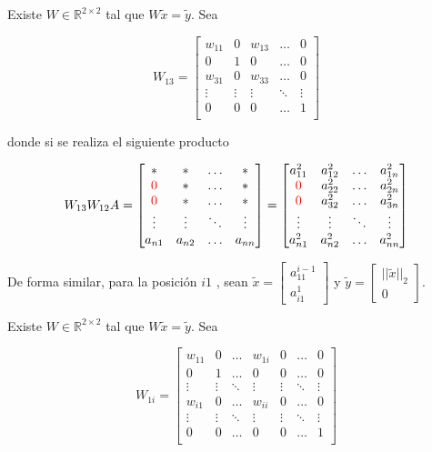 Existe $W \in \mathbb{R}^{2 \times 2}$ tal que $W\tilde{x} = \tilde{y}$. Sea

\[
W_{13} =
\begin{bmatrix}
    w_{11} & 0 & w_{13} & \ldots & 0 \\
    0 & 1 & 0 & \ldots & 0 \\
    w_{31} & 0 & w_{33} & \ldots & 0 \\
    \vdots & \vdots & \vdots & \ddots & \vdots \\
    0 & 0 & 0 & \ldots & 1 \\
\end{bmatrix}
\]

donde si se realiza el siguiente producto

\[
W_{13}W_{12}A =
\begin{bmatrix}
    * & * & \ldots & * \\
    \textcolor{red}{0} & * & \ldots & * \\
    \textcolor{red}{0} & * & \ldots & * \\
    \vdots & \vdots & \ddots & \vdots \\
    a_{n1} & a_{n2} & \ldots & a_{nn} \\
\end{bmatrix}
=
\begin{bmatrix}
    a_{11}^{2} & a_{12}^{2} & \ldots & a_{1n}^{2} \\
    \textcolor{red}{0} & a_{22}^{2} & \ldots & a_{2n}^{2} \\
    \textcolor{red}{0} & a_{32}^{2} & \ldots & a_{3n}^{2} \\
    \vdots & \vdots & \ddots & \vdots \\
    a_{n1}^{2} & a_{n2}^{2} & \ldots & a_{nn}^{2} \\
\end{bmatrix}
\]


De forma similar, para la posición $i1$ , sean $\tilde{x} = \begin{bmatrix}
    a_{11}^{i-1} \\ a_{i1}^1
\end{bmatrix}$ y $\tilde{y} = \begin{bmatrix}
    {||\tilde{x}||}_{2} \\ 0
\end{bmatrix}$.

Existe $W \in \mathbb{R}^{2 \times 2}$ tal que $W\tilde{x} = \tilde{y}$. Sea

\[
W_{1i} =
\begin{bmatrix}
    w_{11} & 0 & \ldots & w_{1i} & 0 & \ldots & 0 \\
    0 & 1 & \ldots & 0 & 0 & \ldots & 0 \\
    \vdots & \vdots & \ddots & \vdots & \vdots & \ddots & \vdots \\
    w_{i1} & 0 & \ldots & w_{ii} & 0 & \ldots & 0 \\
    \vdots & \vdots & \ddots & \vdots & \vdots & \ddots & \vdots \\
    0 & 0 & \ldots & 0 & 0 & \ldots & 1 \\
\end{bmatrix}
\]

